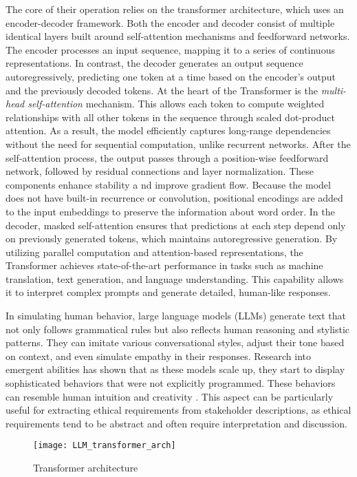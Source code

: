 The core of their operation relies on the transformer architecture, which uses an encoder-decoder framework. Both the encoder and decoder consist of multiple identical layers built around 
self-attention mechanisms and feedforward networks. The encoder processes an input sequence, mapping it to a series of continuous representations. In contrast, the decoder generates an output 
sequence autoregressively, predicting one token at a time based on the encoder's output and the previously decoded tokens.
At the heart of the Transformer is the \textit{multi-head self-attention} mechanism. This allows each token to compute weighted relationships with all other tokens in the sequence through scaled 
dot-product attention. As a result, the model efficiently captures long-range dependencies without the need for sequential computation, unlike recurrent networks.
After the self-attention process, the output passes through a position-wise feedforward network, followed by residual connections and layer normalization. These components enhance stability a
nd improve gradient flow. Because the model does not have built-in recurrence or convolution, positional encodings are added to the input embeddings to preserve the information about word order.
In the decoder, masked self-attention ensures that predictions at each step depend only on previously generated tokens, which maintains autoregressive generation. By utilizing parallel 
computation and attention-based representations, the Transformer achieves state-of-the-art performance in tasks such as machine translation, text generation, and language understanding. 
This capability allows it to interpret complex prompts and generate detailed, human-like responses\cite{NEURIPS2020_1457c0d6}.


In simulating human behavior, large language models (LLMs) generate text that not only follows grammatical rules but also reflects human reasoning and stylistic patterns. They can imitate 
various conversational styles, adjust their tone based on context, and even simulate empathy in their responses. Research into emergent abilities has shown that as these models scale up, 
they start to display sophisticated behaviors that were not explicitly programmed. These behaviors can resemble human intuition and creativity \cite{Lockhart2024}. This aspect can be 
particularly useful for extracting ethical requirements from stakeholder descriptions, as ethical requirements tend to be abstract and often require interpretation and discussion.


\begin{figure}[h]
  \centering
  \texttt{[image: LLM\_transformer\_arch]}
  \caption{Transformer architecture}
  \label{fig:LLM_transformer_arch}
\end{figure}

